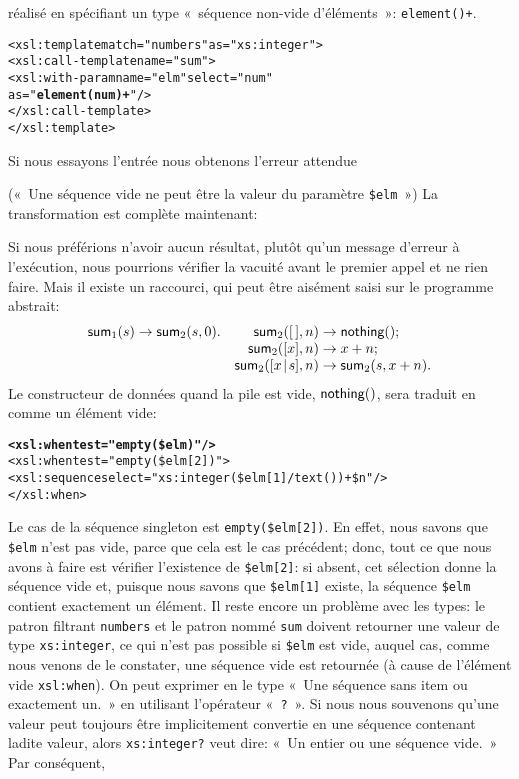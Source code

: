 réalisé en spécifiant un type «~séquence non-vide d'éléments~»:
\texttt{element()+}.
\begin{alltt}
\small  <xsl:template match="numbers" as="xs:integer">
    <xsl:call-template name="sum">
      <xsl:with-param name="elm" select="num"
                                 as="\textbf{element(num)+}"/>
    </xsl:call-template>
  </xsl:template>
\end{alltt}
Si nous essayons l'entrée
\noindent nous obtenons l'erreur attendue
(«~Une séquence vide ne peut être la valeur du paramètre
\texttt{\$elm}~») La transformation est complète maintenant:

Si nous préférions n'avoir aucun résultat, plutôt qu'un message
d'erreur à l'exécution, nous pourrions vérifier la vacuité avant le
premier appel et ne rien faire. Mais il existe un raccourci, qui peut
être aisément saisi sur le programme abstrait:
\begin{equation*}
\begin{array}{@{}r@{\;}l@{\;}lr@{\;}l@{\;}l@{}}
\fun{sum}_1(s) & \rightarrow & \fun{sum}_2(s,0). &
    \fun{sum}_2(\el,n) & \rightarrow & \fun{nothing}();\\
&&& \fun{sum}_2([x],n) & \rightarrow & x+n;\\
&&& \fun{sum}_2(\cons{x}{s},n) & \rightarrow & \fun{sum}_2(s,x+n).
\end{array}
\end{equation*}
Le constructeur de données quand la pile est vide,
\(\textsf{nothing}()\), sera traduit en \XSLT comme un élément vide:
\begin{alltt}
\small      \textbf{<xsl:when test="empty(\$elm)"/>}
      <xsl:when test="empty(\$elm[2])">
        <xsl:sequence select="xs:integer(\$elm[1]/text()) + \$n"/>
      </xsl:when>
\end{alltt}
Le cas de la séquence singleton est \texttt{empty(\$elm[2])}. En
effet, nous savons que \texttt{\$elm} n'est pas vide, parce que cela
est le cas précédent; donc, tout ce que nous avons à faire est
vérifier l'existence de \texttt{\$elm[2]}: si absent, cet sélection
donne la séquence vide et, puisque nous savons que \texttt{\$elm[1]}
existe, la séquence \texttt{\$elm} contient exactement un élément. Il
reste encore un problème avec les types: le patron filtrant
\texttt{numbers} et le patron nommé \texttt{sum} doivent retourner une
valeur de type \texttt{xs:integer}, ce qui n'est pas possible si
\texttt{\$elm} est vide, auquel cas, comme nous venons de le
constater, une séquence vide est retournée (à cause de l'élément vide
\texttt{xsl:when}). On peut exprimer en \XPath le type «~Une séquence
sans item ou exactement un.~» en utilisant l'opérateur «~\texttt{?}~». Si
nous nous souvenons qu'une valeur peut toujours être implicitement
convertie en une séquence contenant ladite valeur, alors
\texttt{xs:integer?} veut dire: «~Un entier ou une séquence vide.~» Par
conséquent, 

